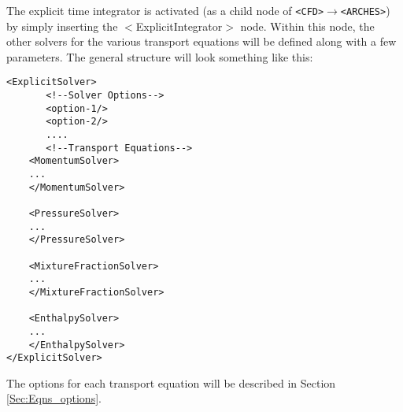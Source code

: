 The explicit time integrator is activated (as a child node of \verb=<CFD>=$\rightarrow$\verb=<ARCHES>=) by simply inserting the $<$ExplicitIntegrator$>$ node.  Within this node,  the other solvers for the various transport equations will be defined along with a few parameters.  The general structure will look something like this:
%
\begin{Verbatim}[fontsize=\footnotesize]
<ExplicitSolver>
	   <!--Solver Options-->
	   <option-1/>
	   <option-2/>
	   ....
	   <!--Transport Equations-->
	<MomentumSolver>
	...
	</MomentumSolver>
	
	<PressureSolver>
	...
	</PressureSolver>
	
	<MixtureFractionSolver>
	...
	</MixtureFractionSolver>
	
	<EnthalpySolver>
	...
	</EnthalpySolver>
</ExplicitSolver>
\end{Verbatim}  
%
The options for each transport equation will be described in Section \ref{Sec:Eqns_options}. 

